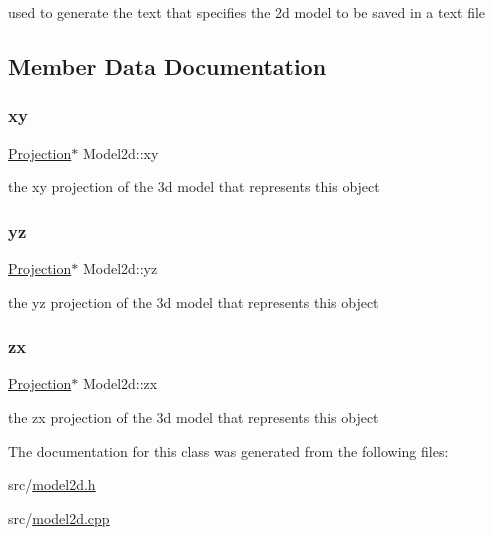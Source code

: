 used to generate the text that specifies the 2d model to be saved in a text file 



\subsection{Member Data Documentation}
\mbox{\label{class_model2d_ad335c0d9899b23996a3f11e61be1d431}} 
\subsubsection{\texorpdfstring{xy}{xy}}
{\footnotesize\ttfamily \mbox{\hyperlink{class_projection}{Projection}}$\ast$ Model2d\+::xy}



the xy projection of the 3d model that represents this object 

\mbox{\label{class_model2d_a4d012de876b8bb089bd226e41270df25}} 
\subsubsection{\texorpdfstring{yz}{yz}}
{\footnotesize\ttfamily \mbox{\hyperlink{class_projection}{Projection}}$\ast$ Model2d\+::yz}



the yz projection of the 3d model that represents this object 

\mbox{\label{class_model2d_a6c459c26e4c89bbc11ac0149ea07b997}} 
\subsubsection{\texorpdfstring{zx}{zx}}
{\footnotesize\ttfamily \mbox{\hyperlink{class_projection}{Projection}}$\ast$ Model2d\+::zx}



the zx projection of the 3d model that represents this object 



The documentation for this class was generated from the following files\+:\begin{DoxyCompactItemize}
\item 
src/\mbox{\hyperlink{model2d_8h}{model2d.\+h}}\item 
src/\mbox{\hyperlink{model2d_8cpp}{model2d.\+cpp}}\end{DoxyCompactItemize}
